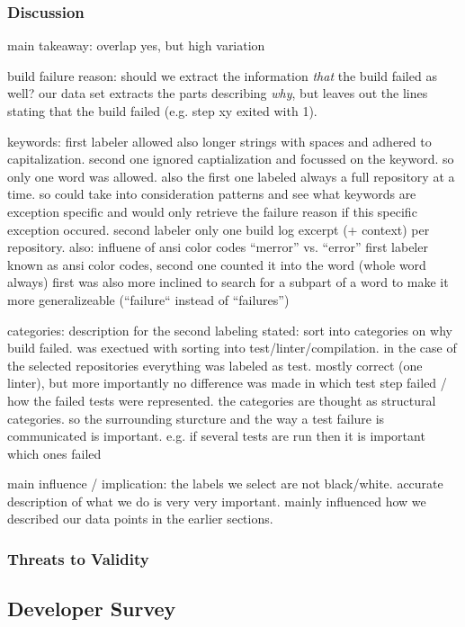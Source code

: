 \documentclass[\myrootdir/main.tex]{subfiles}
\begin{document}
\subsubsection{Discussion}
main takeaway: overlap yes, but high variation 

build failure reason: should we extract the information \emph{that} the build failed as well?
our data set extracts the parts describing \emph{why}, but leaves out the lines stating that the build failed (e.g. step xy exited with 1).

keywords: first labeler allowed also longer strings with spaces and adhered to capitalization.
second one ignored captialization and focussed on the keyword.
so only one word was allowed.
also the first one labeled always a full repository at a time.
so could take into consideration patterns and see what keywords are exception specific and would only retrieve the failure reason if this specific exception occured.
second labeler only one build log excerpt (+ context) per repository.
also: influene of ansi color codes ``merror'' vs. ``error'' first labeler known as ansi color codes, second one counted it into the word (whole word always)
first was also more inclined to search for a subpart of a word to make it more generalizeable (``failure`` instead of ``failures'')

categories: description for the second labeling stated: sort into categories on why build failed.
was exectued with sorting into test/linter/compilation.
in the case of the selected repositories everything was labeled as test. mostly correct (one linter), but more importantly no difference was made in which test step failed / how the failed tests were represented.
the categories are thought as structural categories.
so the surrounding sturcture and the way a test failure is communicated is important. e.g. if several tests are run then it is important which ones failed

main influence / implication: the labels we select are not black/white. accurate description of what we do is very very important. mainly influenced how we described our data points in the earlier sections.
\subsubsection{Threats to Validity}

\subsection{Developer Survey}
\end{document}
